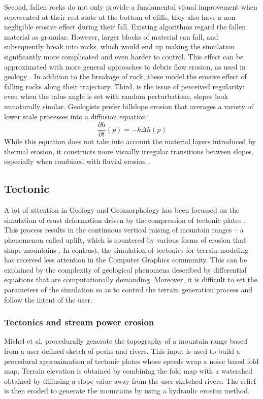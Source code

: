 \documentclass{article}
\begin{document}
Second, fallen rocks do not only provide a fundamental visual improvement when represented at their rest state at the bottom of cliffs, they also have a non negligible erosive effect during their fall. Existing algorithms regard the fallen material as granular. However, larger blocks of material can fall, and subsequently break into rocks, which would end up making the simulation significantly more complicated and even harder to control. This effect can be approximated with more general approaches to debris flow erosion, as used in geology \cite{SD03}. In addition to the breakage of rock, these model the erosive effect of falling rocks along their trajectory. Third, is the issue of perceived regularity: even when the talus angle is set with random perturbations, slopes look unnaturally similar. Geologists prefer hillslope erosion that averages a variety of lower scale processes into a diffusion equation:
\[
\frac{\partial h}{\partial t}(p) = -k \Delta h(p)
\]
While this equation does not take into account the material layers introduced by thermal erosion, it constructs more visually irregular transitions between slopes, especially when combined with fluvial erosion \cite{BS97}.

\subsection{Tectonic}

A lot of attention in Geology and Geomorphology has been focussed on the simulation of crust deformation driven by the compression of tectonic plates \cite{McC92}. This process results in the continuous vertical raising of mountain ranges – a phenomenon called uplift, which is countered by various forms of erosion that shape mountains \cite{TH10}. In contrast, the simulation of tectonics for terrain modeling has received less attention in the Computer Graphics community. This can be explained by the complexity of geological phenomena described by differential equations that are computationally demanding. Moreover, it is difficult to set the parameters of the simulation so as to control the terrain generation process and follow the intent of the user.

\subsubsection{Tectonics and stream power erosion}

Michel et al. \cite{MEC15} procedurally generate the topography of a mountain range based from a user-defined sketch of peaks and rivers. This input is used to build a procedural approximation of tectonic plates whose speeds wrap a noise based fold map. Terrain elevation is obtained by combining the fold map with a watershed obtained by diffusing a slope value away from the user-sketched rivers. The relief is then eroded to generate the mountains by using a hydraulic erosion method.
\end{document}
